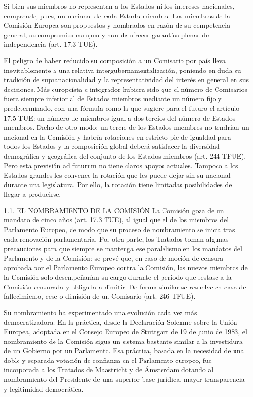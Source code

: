 \documentclass[10pt,a4paper]{article}
\begin{document}
Si bien sus miembros no representan a los Estados ni los intereses nacionales, comprende, pues, un nacional de cada Estado miembro. Los miembros de la Comisión Europea son propuestos y nombrados en razón de su competencia general, su compromiso europeo y han de ofrecer garantías plenas de independencia (art. 17.3 TUE).

El peligro de haber reducido su composición a un Comisario por país lleva inevitablemente a una relativa intergubernamentalización, poniendo en duda su tradición de supranacionalidad y la representatividad del interés en general en sus decisiones. Más europeísta e integrador hubiera sido que el número de Comisarios fuera siempre inferior al de Estados miembros mediante un número fijo y predeterminado, con una fórmula como la que sugiere para el futuro el artículo 17.5 TUE: un número de miembros igual a dos tercios del número de Estados miembros. Dicho de otro modo: un tercio de los Estados miembros no tendrían un nacional en la Comisión y habría rotaciones en estricto pie de igualdad para todos los Estados y la composición global deberá satisfacer la diversidad demográfica y geográfica del conjunto de los Estados miembros (art. 244 TFUE). Pero esta previsión ad futurum no tiene claros apoyos actuales. Tampoco a los Estados grandes les convence la rotación que les puede dejar sin su nacional durante una legislatura. Por ello, la rotación tiene limitadas posibilidades de llegar a producirse.

1.1. EL NOMBRAMIENTO DE LA COMISIÓN
La Comisión goza de un mandato de cinco años (art. 17.3 TUE), al igual que el de los miembros del Parlamento Europeo, de modo que su proceso de nombramiento se inicia tras cada renovación parlamentaria. Por otra parte, los Tratados toman algunas precauciones para que siempre se mantenga ese paralelismo en los mandatos del Parlamento y de la Comisión: se prevé que, en caso de moción de censura aprobada por el Parlamento Europeo contra la Comisión, los nuevos miembros de la Comisión solo desempeñarían su cargo durante el período que restase a la Comisión censurada y obligada a dimitir. De forma similar se resuelve en caso de fallecimiento, cese o dimisión de un Comisario (art. 246 TFUE).

Su nombramiento ha experimentado una evolución cada vez más democratizadora. En la práctica, desde la Declaración Solemne sobre la Unión Europea, adoptada en el Consejo Europeo de Stuttgart de 19 de junio de 1983, el nombramiento de la Comisión sigue un sistema bastante similar a la investidura de un Gobierno por un Parlamento. Esa práctica, basada en la necesidad de una doble y separada votación de confianza en el Parlamento europeo, fue incorporada a los Tratados de Maastricht y de Ámsterdam dotando al nombramiento del Presidente de una superior base jurídica, mayor transparencia y legitimidad democrática.
\end{document}
